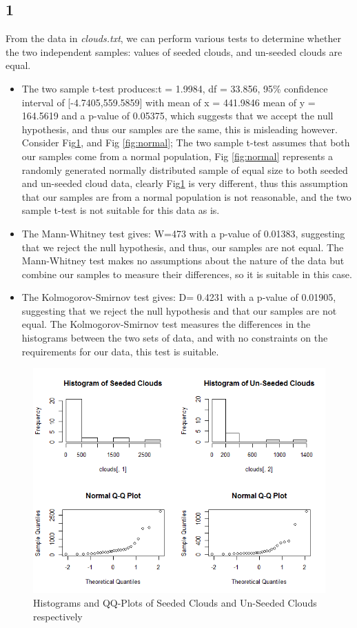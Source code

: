 \documentclass{article}
\begin{document}
    \subsection*{1}
    From the data in \textit{clouds.txt}, we can perform various tests to determine whether the two independent samples: values of seeded clouds, and un-seeded clouds are equal.
    \begin{itemize}
    \item The two sample t-test produces:t = 1.9984, df = 33.856, 95\% confidence interval of [-4.7405,559.5859] with mean of x = 441.9846 mean of y = 164.5619 and a p-value of 0.05375, which suggests that we accept the null hypothesis, and thus our samples are the same, this is misleading however. Consider Fig\ref{fig:clouds}, and Fig \ref{fig:normal}; The two sample t-test assumes that both our samples come from a normal population, Fig \ref{fig:normal} represents a randomly generated normally distributed sample of equal size to both seeded and un-seeded cloud data, clearly Fig\ref{fig:clouds} is very different, thus this assumption that our samples are from a normal population is not reasonable, and the two sample t-test is not suitable for this data as is.
    \item The Mann-Whitney test gives: W=473 with a p-value of 0.01383, suggesting that we reject the null hypothesis, and thus, our samples are not equal. The Mann-Whitney test makes no assumptions about the nature of the data but combine our samples to measure their differences, so it is suitable in this case.
    \item The Kolmogorov-Smirnov test gives: D= 0.4231 with a p-value of 0.01905, suggesting that we reject the null hypothesis and that our samples are not equal. The Kolmogorov-Smirnov test measures the differences in the histograms between the two sets of data, and with no constraints on the requirements for our data, this test is suitable.
    \end{itemize}
    
    \begin{figure}[!htb]
      \includegraphics[scale=0.5]{../results/2_1.png}
      \caption{Histograms and QQ-Plots of Seeded Clouds and Un-Seeded Clouds respectively}
      \label{fig:clouds}
    \end{figure}
     
\end{document}

